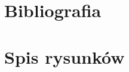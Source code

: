 \documentclass[12pt]{article}
\begin{document}
	{
		\section{Bibliografia}
		\printbibliography[heading=none]
	}

	{

		\section{Spis rysunków}
		\listofcaptioneds
		\thispagestyle{fancy}
	}
\end{document}
